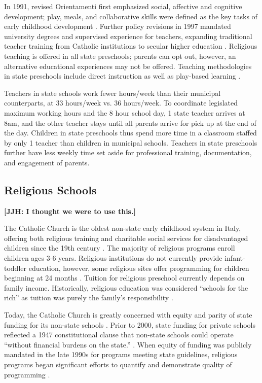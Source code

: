 In 1991, revised Orientamenti first emphasized social, affective and cognitive development; play, meals, and collaborative skills were defined as the key tasks of early childhood development \citep{Corsaro_1996_Early-Edu}. Further policy revisions in 1997 mandated university degrees and supervised experience for teachers, expanding traditional teacher training from Catholic institutions to secular higher education \citep{Ghedini_2001_Ital-Natl-Policy}. Religious teaching is offered in all state preschools; parents can opt out, however, an alternative educational experiences may not be offered. Teaching methodologies in state preschools include direct instruction as well as play-based learning \citep{CEHD_2016_Historical-Analysis}.

Teachers in state schools work fewer hours/week than their municipal counterparts, at 33 hours/week vs. 36 hours/week. To coordinate legislated maximum working hours and the 8 hour school day, 1 state teacher arrives at 8am, and the other teacher stays until all parents arrive for pick up at the end of the day. Children in state preschools thus spend more time in a classroom staffed by only 1 teacher than children in municipal schools. Teachers in state preschools further have less weekly time set aside for professional training, documentation, and engagement of parents.

\subsection{Religious Schools}

\textbf{[JJH: I thought we were to use this.]}

The Catholic Church is the oldest non-state early childhood system in Italy, offering both religious training and charitable social services for disadvantaged children since the 19th century \citep{OECD_2001_Italy-Country-Note}. The majority of religious programs enroll children ages 3-6 years. Religious institutions do not currently provide infant-toddler education, however, some religious sites offer programming for children beginning at 24 months \citep{Malizia-Cicatelli_2011_BOOK_Catholic-School}. Tuition for religious preschool currently depends on family income. Historically, religious education was considered ``schools for the rich'' as tuition was purely the family's responsibility \citep{Ribolzi_2013_Italy}.

Today, the Catholic Church is greatly concerned with equity and parity of state funding for its non-state schools \citep{Malizia-Cicatelli_2011_BOOK_Catholic-School}. Prior to 2000, state funding for private schools reflected a 1947 constitutional clause that non-state schools could operate ``without financial burdens on the state.''  \citep{Hohnerlein_2009_Paradox-Public-Preschools}. When equity of funding was publicly mandated in the late 1990s for programs meeting state guidelines, religious programs began significant efforts to quantify and demonstrate quality of programming \citep{Malizia-Cicatelli_2011_BOOK_Catholic-School}.

